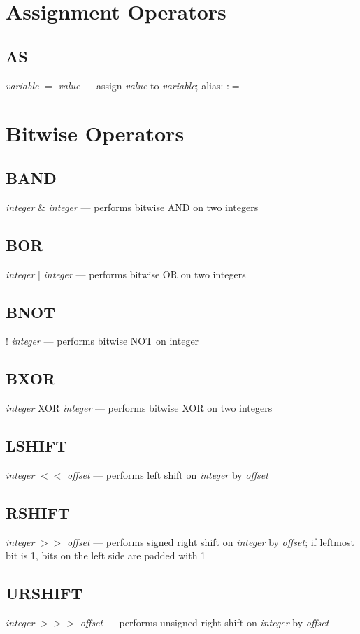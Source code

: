 \section{Assignment Operators}

\subsection{AS} \emph{variable} $=$ \emph{value} --- assign \emph{value} to \emph{variable}; alias: :$=$


\section{Bitwise Operators}

\subsection{BAND} \emph{integer} \& \emph{integer} --- performs bitwise AND on two integers
\subsection{BOR} \emph{integer} | \emph{integer} --- performs bitwise OR on two integers
\subsection{BNOT} ! \emph{integer} --- performs bitwise NOT on integer
\subsection{BXOR} \emph{integer} XOR \emph{integer} --- performs bitwise XOR on two integers
\subsection{LSHIFT} \emph{integer} $<$$<$ \emph{offset} --- performs left shift on \emph{integer} by \emph{offset}
\subsection{RSHIFT} \emph{integer} $>$$>$ \emph{offset} --- performs signed right shift on \emph{integer} by \emph{offset}; if leftmost bit is 1, bits on the left side are padded with 1
\subsection{URSHIFT} \emph{integer} $>$$>$$>$ \emph{offset} --- performs unsigned right shift on \emph{integer} by \emph{offset}


